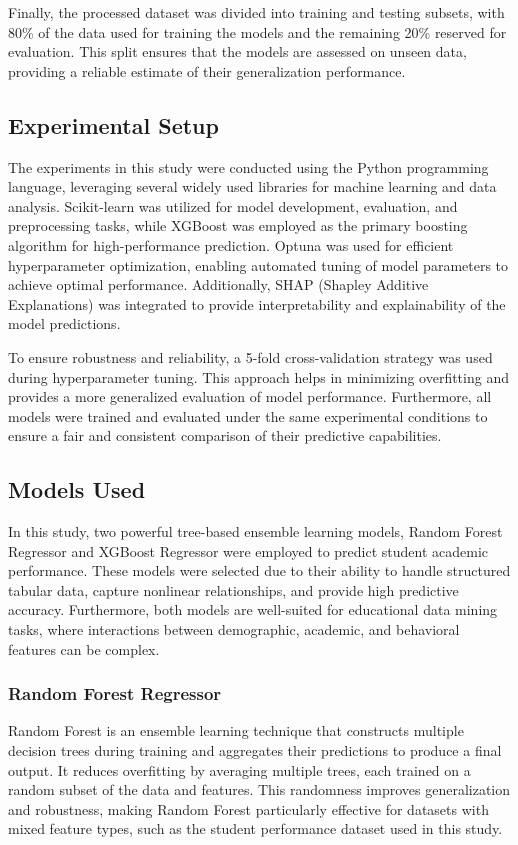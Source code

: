 \documentclass[conference]{IEEEtran}
\begin{document}
Finally, the processed dataset was divided into training and testing subsets, with 80\% of the data used for training the models and the remaining 20\% reserved for evaluation. This split ensures that the models are assessed on unseen data, providing a reliable estimate of their generalization performance. 

\subsection{Experimental Setup}
The experiments in this study were conducted using the Python programming language, leveraging several widely used libraries for machine learning and data analysis. Scikit-learn was utilized for model development, evaluation, and preprocessing tasks, while XGBoost was employed as the primary boosting algorithm for high-performance prediction. Optuna was used for efficient hyperparameter optimization, enabling automated tuning of model parameters to achieve optimal performance. Additionally, SHAP (Shapley Additive Explanations) was integrated to provide interpretability and explainability of the model predictions. 

To ensure robustness and reliability, a 5-fold cross-validation strategy was used during hyperparameter tuning. This approach helps in minimizing overfitting and provides a more generalized evaluation of model performance. Furthermore, all models were trained and evaluated under the same experimental conditions to ensure a fair and consistent comparison of their predictive capabilities. 

\subsection{Models Used}
In this study, two powerful tree-based ensemble learning models, Random Forest Regressor and XGBoost Regressor were employed to predict student academic performance. These models were selected due to their ability to handle structured tabular data, capture nonlinear relationships, and provide high predictive accuracy. Furthermore, both models are well-suited for educational data mining tasks, where interactions between demographic, academic, and behavioral features can be complex. 
\subsubsection{Random Forest Regressor}
Random Forest is an ensemble learning technique that constructs multiple decision trees during training and aggregates their predictions to produce a final output. It reduces overfitting by averaging multiple trees, each trained on a random subset of the data and features. This randomness improves generalization and robustness, making Random Forest particularly effective for datasets with mixed feature types, such as the student performance dataset used in this study. 
\end{document}
